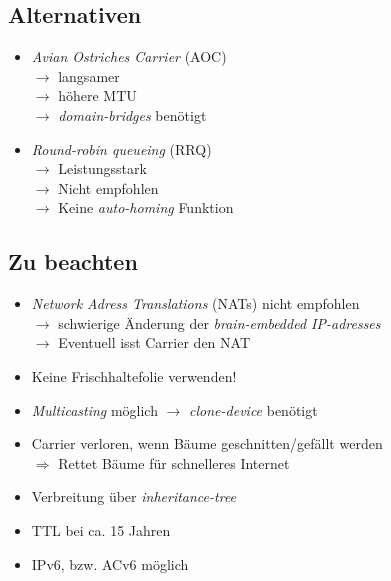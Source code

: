 \documentclass{beamer}
\begin{document}
	\subsection{Alternativen}
	\begin{frame}
		\begin{itemize}
			\item \textit{Avian Ostriches Carrier} (AOC)\\
				$\rightarrow$ langsamer\\
				$\rightarrow$ höhere MTU\\
				$\rightarrow$ \textit{domain-bridges} benötigt
			\item \textit{Round-robin queueing} (RRQ)\\
				$\rightarrow$ Leistungsstark\\
				$\rightarrow$ Nicht empfohlen\\
				$\rightarrow$ Keine \textit{auto-homing} Funktion
		\end{itemize}
	\end{frame}
	\subsection{Zu beachten}
	\begin{frame}
		\begin{itemize}
			\item \textit{Network Adress Translations} (NATs) nicht empfohlen\\
				$\rightarrow$ schwierige Änderung der \textit{brain-embedded IP-adresses}\\
				$\rightarrow$ Eventuell isst Carrier den NAT
			\item Keine Frischhaltefolie verwenden!
			\item \textit{Multicasting} möglich $\rightarrow$ \textit{clone-device} benötigt
		\end{itemize}
	\end{frame}
	\begin{frame}
		\begin{itemize}
			\item Carrier verloren, wenn Bäume geschnitten/gefällt werden\\
				$\Rightarrow$ Rettet Bäume für schnelleres Internet
			\item Verbreitung über \textit{inheritance-tree}
			\item TTL bei ca. 15 Jahren
			\item IPv6, bzw. ACv6 möglich
		\end{itemize}
	\end{frame}
\end{document}
